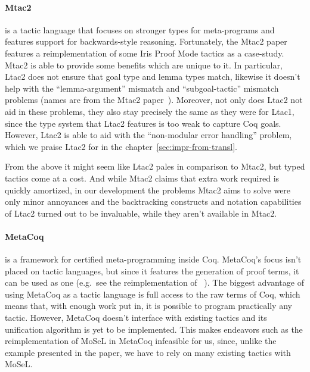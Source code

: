 \paragraph{Mtac2~\cite{kaiserMtac2TypedTactics2018a}} is a tactic language that focuses on stronger types for meta-programs and features support for backwards-style reasoning.
  Fortunately, the Mtac2 paper~\cite{kaiserMtac2TypedTactics2018a} features a reimplementation of some Iris Proof Mode tactics as a case-study.
  Mtac2 is able to provide some benefits which are unique to it.
  In particular, Ltac2 does not ensure that goal type and lemma types match, likewise it doesn't help with the ``lemma-argument'' mismatch and ``subgoal-tactic'' mismatch problems (names are from the Mtac2 paper~\cite[Section~5.4]{kaiserMtac2TypedTactics2018a}).
  Moreover, not only does Ltac2 not aid in these problems, they also stay precisely the same as they were for Ltac1, since the type system that Ltac2 features is too weak to capture Coq goals.
  However, Ltac2 is able to aid with the ``non-modular error handling'' problem, which we praise Ltac2 for in the chapter~\ref{sec:impr-from-transl}.

  From the above it might seem like Ltac2 pales in comparison to Mtac2, but typed tactics come at a cost.
  And while Mtac2 claims that extra work required is quickly amortized, in our development the problems Mtac2 aims to solve were only minor annoyances and the backtracking constructs and notation capabilities of Ltac2 turned out to be invaluable, while they aren't available in Mtac2.

\paragraph{MetaCoq~\cite{sozeauMetaCoqProject2020}} is a framework for certified meta-programming inside Coq.
  MetaCoq's focus isn't placed on tactic languages, but since it features the generation of proof terms, it can be used as one (e.g.\ see the reimplementation of ~\cite[Section~4.2]{sozeauMetaCoqProject2020}).
  The biggest advantage of using MetaCoq as a tactic language is full access to the raw terms of Coq, which means that, with enough work put in, it is possible to program practically any tactic.
  However, MetaCoq doesn't interface with existing tactics and its unification algorithm is yet to be implemented.
  This makes endeavors such as the reimplementation of MoSeL in MetaCoq infeasible for us, since, unlike the example presented in the paper, we have to rely on many existing tactics with MoSeL.

